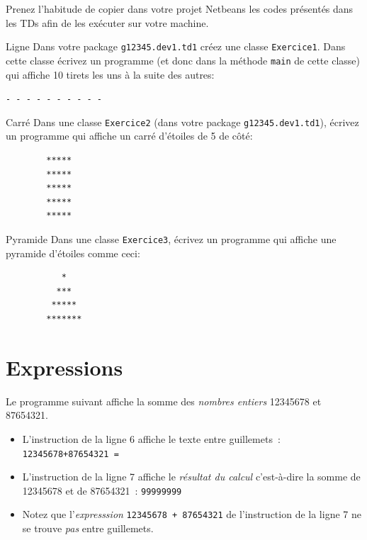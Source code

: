 \documentclass[a4paper,11pt]{article}
\begin{document}
	Prenez l'habitude de copier dans votre projet Netbeans les codes présentés dans les TDs afin de
	les exécuter sur votre machine.



	\begin{Exercice}{Ligne}
		Dans votre package \texttt{g12345.dev1.td1} créez une classe \texttt{Exercice1}.
		Dans cette classe écrivez un programme  (et donc dans la méthode \texttt{main} de cette classe) 
		qui affiche 10 tirets les uns à la suite des autres:

		\texttt{- - - - - - - - - -}
	\end{Exercice}
	
	\begin{Exercice}{Carré}
		Dans une classe \texttt{Exercice2} (dans votre package \texttt{g12345.dev1.td1}), écrivez un programme qui affiche un carré d'étoiles de 5 de côté:

		\begin{verbatim}
		*****
		*****
		*****
		*****
		*****
		\end{verbatim}
	\end{Exercice}

	\begin{Exercice}{Pyramide}
		Dans une classe \texttt{Exercice3}, écrivez un programme qui affiche une pyramide d'étoiles comme ceci:

		\begin{verbatim}
		   *
		  ***
		 *****
		*******
		\end{verbatim}
	\end{Exercice}



\section{Expressions}

	Le programme suivant affiche la somme des \emph{nombres entiers}  12345678 et 87654321.
	

	\begin{itemize}
		\item	L'instruction de la ligne 6 affiche le texte entre guillemets~: \texttt{12345678+87654321 = }
	
		\item L'instruction de la ligne 7 affiche le \emph{résultat du calcul} 
			c'est-à-dire la somme de 12345678 et de 87654321~:  \texttt{99999999}
	
		\item Notez que l'\emph{expresssion} \texttt{12345678 + 87654321} 
			de l'instruction de la ligne 7 ne se trouve \emph{pas} entre guillemets.
	\end{itemize}
	
\end{document}
